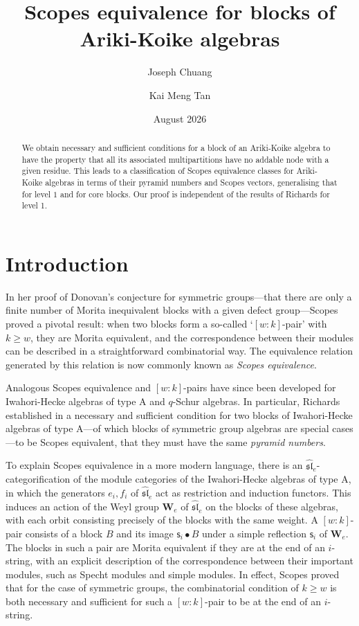 \documentclass[11pt,a4paper,reqno]{amsart}
\title{Scopes equivalence for blocks of Ariki-Koike algebras}
\author{Joseph Chuang}
\author{Kai Meng Tan}
\date{August 2026}
\numberwithin{equation}{section}
\theoremstyle{plain}
\theoremstyle{definition}
\theoremstyle{remark}
\numberwithin{equation}{section}
\newcommand{\cs}{\mathsf{s}}
\newcommand{\AW}{\mathbf{W}}
\newcommand{\DDot}[1]{\mathrel{\overset{#1}{\bullet}}}
\begin{document}
\maketitle

\begin{abstract}
We obtain necessary and sufficient conditions for a block of an Ariki-Koike algebra to have the property that all its associated multipartitions have no addable node with a given residue.
This leads to a classification of Scopes equivalence classes for Ariki-Koike algebras in terms of their pyramid numbers and Scopes vectors, generalising that for level $1$ and for core blocks.
Our proof is independent of the results of Richards \cite{R} for level 1.
\end{abstract}

\section{Introduction}


In her proof of Donovan's conjecture for symmetric groups---that there are only a finite number of Morita inequivalent blocks with a given defect group---Scopes proved \cite{Scopes} a pivotal result: when two blocks form a so-called `$[w:k]$-pair' with $k \geq w$, they are Morita equivalent, and the correspondence between their modules can be described in a straightforward  combinatorial way.
The equivalence relation generated by this relation is now commonly known as {\em Scopes equivalence}.

Analogous Scopes equivalence and $[w:k]$-pairs have since been developed for Iwahori-Hecke algebras of type A and $q$-Schur algebras.
In particular, Richards established in \cite{R} a necessary and sufficient condition for two blocks of Iwahori-Hecke algebras of type A---of which blocks of symmetric group algebras are special cases---to be Scopes equivalent, that they must have the same {\em pyramid numbers}.

To explain Scopes equivalence in a more modern language, there is an $\widehat{\mathfrak{sl}}_e$-categorification of the module categories of the Iwahori-Hecke algebras of type A, in which the generators $e_i, f_i$ of $\widehat{\mathfrak{sl}}_e$ act as restriction and induction functors.
This induces an action of the Weyl group $\AW_e$ of $\widehat{\mathfrak{sl}}_e$ on the blocks of these algebras, with each orbit consisting precisely of the blocks with the same weight.
A $[w:k]$-pair consists of a block $B$ and its image $\cs_i \DDot{} B$ under a simple reflection $\cs_i$ of $\AW_e$.
The blocks in such a pair are Morita equivalent if they are at the end of an $i$-string, with an explicit description of the correspondence between their important modules, such as Specht modules and simple modules.
In effect, Scopes proved that for the case of symmetric groups, the combinatorial condition of $k \geq w$ is both necessary and sufficient for such a $[w:k]$-pair to be at the end of an $i$-string.
\end{document}
